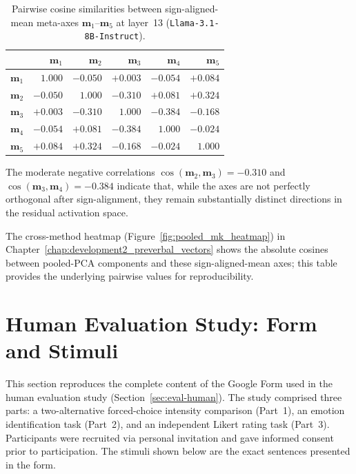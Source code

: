 \begin{table}[htbp]
\centering
\begin{tabular}{lrrrrr}
\hline
& $\mathbf{m}_1$ & $\mathbf{m}_2$ & $\mathbf{m}_3$ & $\mathbf{m}_4$ & $\mathbf{m}_5$ \\
\hline
$\mathbf{m}_1$ & $1.000$  & $-0.050$ & $+0.003$ & $-0.054$ & $+0.084$ \\
$\mathbf{m}_2$ & $-0.050$ & $1.000$  & $-0.310$ & $+0.081$ & $+0.324$ \\
$\mathbf{m}_3$ & $+0.003$ & $-0.310$ & $1.000$  & $-0.384$ & $-0.168$ \\
$\mathbf{m}_4$ & $-0.054$ & $+0.081$ & $-0.384$ & $1.000$  & $-0.024$ \\
$\mathbf{m}_5$ & $+0.084$ & $+0.324$ & $-0.168$ & $-0.024$ & $1.000$  \\
\hline
\end{tabular}
\caption{Pairwise cosine similarities between sign-aligned-mean meta-axes $\mathbf{m}_1$--$\mathbf{m}_5$ at layer~13 (\texttt{Llama-3.1-8B-Instruct}).}
\label{tab:cosine_matrix}
\end{table}

The moderate negative correlations $\cos(\mathbf{m}_2,\mathbf{m}_3) = -0.310$ and
$\cos(\mathbf{m}_3,\mathbf{m}_4) = -0.384$ indicate that, while the axes are not perfectly orthogonal after sign-alignment, they remain substantially distinct directions in the residual activation space.\par

The cross-method heatmap (Figure~\ref{fig:pooled_mk_heatmap}) in Chapter~\ref{chap:development2_preverbal_vectors} shows the absolute cosines between pooled-PCA components and these sign-aligned-mean axes; this table provides the underlying pairwise values for reproducibility.

\section{Human Evaluation Study: Form and Stimuli}
\label{app:human_eval}

This section reproduces the complete content of the Google Form used in the human
evaluation study (Section~\ref{sec:eval-human}).
The study comprised three parts: a two-alternative forced-choice intensity comparison
(Part~1), an emotion identification task (Part~2), and an independent Likert rating task
(Part~3).
Participants were recruited via personal invitation and gave informed consent prior to participation.
The stimuli shown below are the exact sentences presented in the form.

